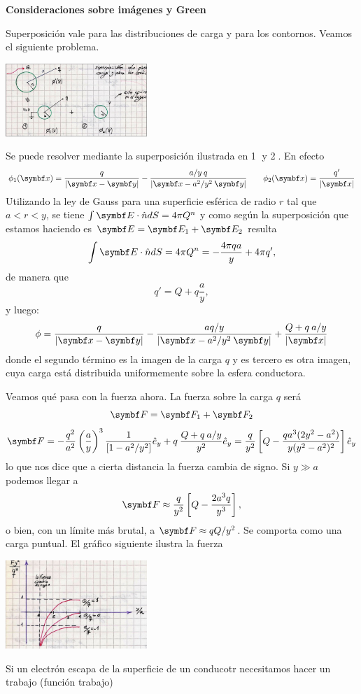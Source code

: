 \documentclass[10pt,oneside]{CBFT_book}
\begin{document}
\begin{ejemplo}{\bf Consideraciones sobre imágenes y Green}

Superposición vale para las distribuciones de carga y para los contornos.
Veamos el siguiente problema.  


\includegraphics[width=0.4\textwidth]{images/fig_ft1_comen_green_super_A.jpg}

Se puede resolver mediante la superposición ilustrada en \textcircled{1} y \textcircled{2}.
En efecto
\[
	\phi_1(\vbx) = \frac{q}{|\vbx - \vb{y}|} - \frac{a/y \: q}{|\vbx - a^2 / y^2 \: \vb{y}|} 
	\qquad \phi_2(\vbx) =\frac{q'}{|\vbx|}
\]
Utilizando la ley de Gauss para una superficie esférica de radio $r$ tal que $a<r<y$, se tiene 
$\int \vb{E}\cdot \hat{n} dS = 4 \pi Q^n$ y como según la superposición que estamos haciendo
es $\vb{E}=\vb{E}_1+\vb{E}_2$ resulta 
\[
	\int \vb{E}\cdot \hat{n} dS = 4 \pi Q^n = -\frac{4 \pi q a}{y} + 4 \pi q',
\]
de manera que 
\[
	q'= Q + q\frac{a}{y},
\]
y luego:
\[
	\phi = \frac{q}{|\vbx - \vb{y}|} - \frac{aq/y}{|\vbx - a^2 / y^2 \: \vb{y}|} +
	\frac{ Q + q \: a/y }{| \vbx |}
\]
donde el segundo término es la imagen de la carga $q$ y es tercero es otra imagen, cuya carga
está distribuida uniformemente sobre la esfera conductora.

Veamos qué pasa con la fuerza ahora.
La fuerza sobre la carga $q$ será
\[
	\vb{F} = \vb{F}_1 + \vb{F}_2
\]
\[
	\vb{F} = - \frac{q^2}{a^2} \Frac{a}{y}^3 \frac{1}{[ 1 - a^2 / y^2 ]} \hat{e}_y + 
	q \: \frac{Q + q \: a/y }{ y^2 } \hat{e}_y = 
	\frac{q}{y^2} \left[ Q - \frac{ q a^3 ( 2y^2 - a^2 ) }{ y ( y^2 - a^2 )^2 } \right] \hat{e}_y
\]
lo que nos dice que a cierta distancia la fuerza cambia de signo. Si $ y \gg a $ podemos llegar
a 
\[
	\vb{F} \approx \frac{q}{y^2} \left[ Q - \frac{2 a^3 q }{y^3} \right],
\]
o bien, con un límite más brutal, a $\vb{F} \approx q Q /y^2$.
Se comporta como una carga puntual.
El gráfico siguiente ilustra la fuerza

\includegraphics[width=0.4\textwidth]{images/fig_ft1_comen_green_super_B.jpg}

Si un electrón escapa de la superficie de un conducotr necesitamos hacer un trabajo (función trabajo)

\end{ejemplo}
\end{document}
